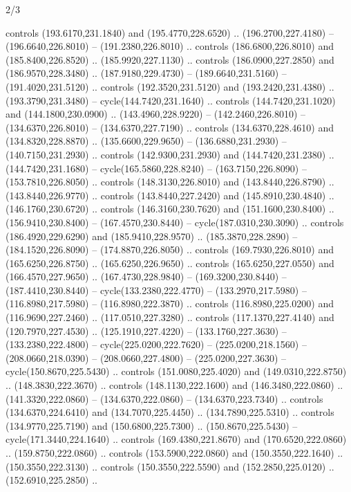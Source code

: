 \begin{flagdescription}{2/3}
\begin{scope}[xshift=0.5\flaglength,yshift=0.5\flagwidth,scale=\stretchfactor]
\begin{scope}[scale=0.001645\flagwidth,yshift=65mm,xshift=-63mm]
\begin{scope}[y=0.80pt, x=0.80pt, yscale=-1,]
\begin{scope}[cm={{1.33333,0.0,0.0,1.33333,(0.0,1e-05)}}]
  controls (193.6170,231.1840) and (195.4770,228.6520) .. (196.2700,227.4180) --
  (196.6640,226.8010) -- (191.2380,226.8010) .. controls (186.6800,226.8010) and
  (185.8400,226.8520) .. (185.9920,227.1130) .. controls (186.0900,227.2850) and
  (186.9570,228.3480) .. (187.9180,229.4730) -- (189.6640,231.5160) --
  (191.4020,231.5120) .. controls (192.3520,231.5120) and (193.2420,231.4380) ..
  (193.3790,231.3480) -- cycle(144.7420,231.1640) .. controls
  (144.7420,231.1020) and (144.1800,230.0900) .. (143.4960,228.9220) --
  (142.2460,226.8010) -- (134.6370,226.8010) -- (134.6370,227.7190) .. controls
  (134.6370,228.4610) and (134.8320,228.8870) .. (135.6600,229.9650) --
  (136.6880,231.2930) -- (140.7150,231.2930) .. controls (142.9300,231.2930) and
  (144.7420,231.2380) .. (144.7420,231.1680) -- cycle(165.5860,228.8240) --
  (163.7150,226.8090) -- (153.7810,226.8050) .. controls (148.3130,226.8010) and
  (143.8440,226.8790) .. (143.8440,226.9770) .. controls (143.8440,227.2420) and
  (145.8910,230.4840) .. (146.1760,230.6720) .. controls (146.3160,230.7620) and
  (151.1600,230.8400) .. (156.9410,230.8400) -- (167.4570,230.8440) --
  cycle(187.0310,230.3090) .. controls (186.4920,229.6290) and
  (185.9410,228.9570) .. (185.3870,228.2890) -- (184.1520,226.8090) --
  (174.8870,226.8050) .. controls (169.7930,226.8010) and (165.6250,226.8750) ..
  (165.6250,226.9650) .. controls (165.6250,227.0550) and (166.4570,227.9650) ..
  (167.4730,228.9840) -- (169.3200,230.8440) -- (187.4410,230.8440) --
  cycle(133.2380,222.4770) -- (133.2970,217.5980) -- (116.8980,217.5980) --
  (116.8980,222.3870) .. controls (116.8980,225.0200) and (116.9690,227.2460) ..
  (117.0510,227.3280) .. controls (117.1370,227.4140) and (120.7970,227.4530) ..
  (125.1910,227.4220) -- (133.1760,227.3630) -- (133.2380,222.4800) --
  cycle(225.0200,222.7620) -- (225.0200,218.1560) -- (208.0660,218.0390) --
  (208.0660,227.4800) -- (225.0200,227.3630) -- cycle(150.8670,225.5430) ..
  controls (151.0080,225.4020) and (149.0310,222.8750) .. (148.3830,222.3670) ..
  controls (148.1130,222.1600) and (146.3480,222.0860) .. (141.3320,222.0860) --
  (134.6370,222.0860) -- (134.6370,223.7340) .. controls (134.6370,224.6410) and
  (134.7070,225.4450) .. (134.7890,225.5310) .. controls (134.9770,225.7190) and
  (150.6800,225.7300) .. (150.8670,225.5430) -- cycle(171.3440,224.1640) ..
  controls (169.4380,221.8670) and (170.6520,222.0860) .. (159.8750,222.0860) ..
  controls (153.5900,222.0860) and (150.3550,222.1640) .. (150.3550,222.3130) ..
  controls (150.3550,222.5590) and (152.2850,225.0120) .. (152.6910,225.2850) ..

\end{scope}
\end{scope}
\end{scope}
\end{scope}
\end{flagdescription}

